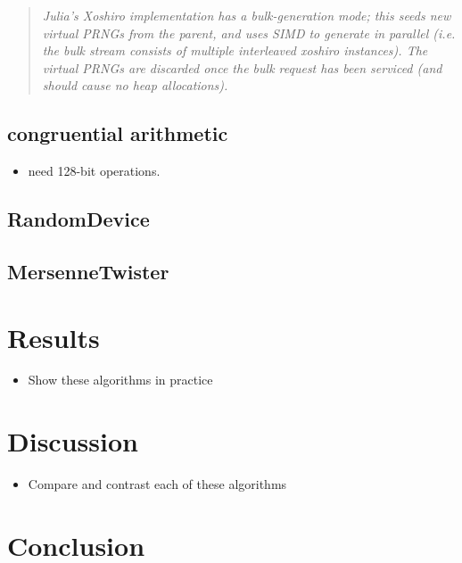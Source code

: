 \documentclass{article}
\begin{document}
            \begin{quote}

                \textit{Julia's Xoshiro implementation has a bulk-generation mode; this seeds new virtual PRNGs from the parent, and uses SIMD to generate in parallel (i.e. the bulk stream consists of multiple interleaved xoshiro instances). The virtual PRNGs are discarded once the bulk request has been serviced (and should cause no heap allocations).}
            \end{quote}

        \subsection*{congruential arithmetic}

            \begin{itemize}
                \item need 128-bit operations.
            \end{itemize}

        \subsection*{RandomDevice}
        
        \subsection*{MersenneTwister}

    \section*{Results}

        \begin{itemize}
            \item Show these algorithms in practice
        \end{itemize}

    \section*{Discussion}

        \begin{itemize}
            \item Compare and contrast each of these algorithms
        \end{itemize}

    \section*{Conclusion}

    \printbibliography
\end{document}
